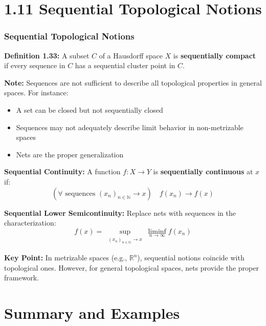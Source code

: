 \documentclass[aspectratio=169,10pt]{beamer}
\begin{document}
\section{1.11 Sequential Topological Notions}

\begin{frame}[allowframebreaks]
\frametitle{Sequential Topological Notions}

\textbf{Definition 1.33:} A subset $C$ of a Hausdorff space $X$ is \textbf{sequentially compact} if every sequence in $C$ has a sequential cluster point in $C$.

\vspace{0.3cm}

\textbf{Note:} Sequences are not sufficient to describe all topological properties in general spaces. For instance:
\begin{itemize}
\item A set can be closed but not sequentially closed
\item Sequences may not adequately describe limit behavior in non-metrizable spaces
\item Nets are the proper generalization
\end{itemize}

\framebreak

\textbf{Sequential Continuity:} A function $f: X \to Y$ is \textbf{sequentially continuous} at $x$ if:
$$(\forall \text{ sequences } (x_n)_{n \in \mathbb{N}} \to x) \quad f(x_n) \to f(x)$$

\vspace{0.3cm}

\textbf{Sequential Lower Semicontinuity:} Replace nets with sequences in the characterization:
$$f(x) = \sup_{\substack{(x_n)_{n \in \mathbb{N}} \to x}} \liminf_{n \to \infty} f(x_n)$$

\framebreak

\textbf{Key Point:} In metrizable spaces (e.g., $\mathbb{R}^n$), sequential notions coincide with topological ones. However, for general topological spaces, nets provide the proper framework.

\end{frame}

\section{Summary and Examples}
\end{document}
